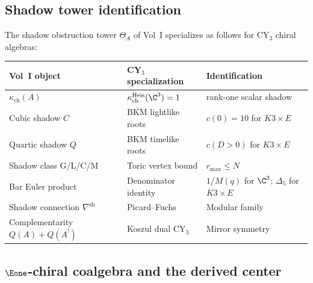 \subsection{Shadow tower identification}
\label{subsec:cross-vol-shadow}

The shadow obstruction tower $\Theta_A$ of Vol~I specializes as follows for CY$_3$ chiral algebras:

\begin{center}
\renewcommand{\arraystretch}{1.3}
\begin{tabular}{lll}
 \toprule
 \textbf{Vol~I object} & \textbf{CY$_3$ specialization} & \textbf{Identification} \\
 \midrule
 $\kappa_{\mathrm{ch}}(A)$ & $\kappa_{\mathrm{ch}}^{\mathrm{Heis}}(\C^3) = 1$ & rank-one scalar shadow \\
 Cubic shadow $C$ & BKM lightlike roots & $c(0) = 10$ for $K3 \times E$ \\
 Quartic shadow $Q$ & BKM timelike roots & $c(D > 0)$ for $K3 \times E$ \\
 Shadow class G/L/C/M & Toric vertex bound & $r_{\mathrm{max}} \leq N$ \\
 Bar Euler product & Denominator identity & $1/M(q)$ for $\C^3$; $\Delta_5$ for $K3 \times E$ \\
 Shadow connection $\nabla^{\mathrm{sh}}$ & Picard--Fuchs & Modular family \\
 Complementarity $Q(A) + Q(A^!)$ & Koszul dual CY$_3$ & Mirror symmetry \\
 \bottomrule
\end{tabular}
\end{center}


\subsection{\texorpdfstring{$\Eone$}{E1}-chiral coalgebra and the derived center}
\label{subsec:cross-vol-sc}

